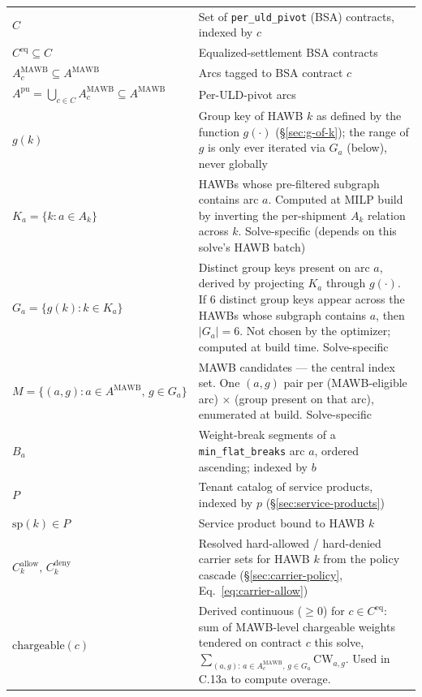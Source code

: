 \documentclass[11pt,a4paper]{article}
\theoremstyle{definition}
\begin{document}
\begin{table}[H]
\begin{tabular}{lp{11.5cm}}
$C$ & Set of \texttt{per\_uld\_pivot} (BSA) contracts, indexed by $c$ \\
$C^{\text{eq}} \subseteq C$ & Equalized-settlement BSA contracts \\
$A_c^{\text{MAWB}} \subseteq A^{\text{MAWB}}$ & Arcs tagged to BSA contract $c$ \\
$A^{\text{pu}} = \bigcup_{c \in C} A_c^{\text{MAWB}} \subseteq A^{\text{MAWB}}$ & Per-ULD-pivot arcs \\
$g(k)$ & Group key of HAWB $k$ as defined by the function $g(\cdot)$ (\S\ref{sec:g-of-k}); the range of $g$ is only ever iterated via $G_a$ (below), never globally \\
$K_a = \{k : a \in A_k\}$ & HAWBs whose pre-filtered subgraph contains arc $a$. Computed at MILP build by inverting the per-shipment $A_k$ relation across $k$. Solve-specific (depends on this solve's HAWB batch) \\
$G_a = \{g(k) : k \in K_a\}$ & Distinct group keys present on arc $a$, derived by projecting $K_a$ through $g(\cdot)$. If 6 distinct group keys appear across the HAWBs whose subgraph contains $a$, then $|G_a| = 6$. Not chosen by the optimizer; computed at build time. Solve-specific \\
$M = \{(a, g) : a \in A^{\text{MAWB}},\, g \in G_a\}$ & MAWB candidates --- the central index set. One $(a, g)$ pair per (MAWB-eligible arc) $\times$ (group present on that arc), enumerated at build. Solve-specific \\
$B_a$ & Weight-break segments of a \texttt{min\_flat\_breaks} arc $a$, ordered ascending; indexed by $b$ \\
$P$ & Tenant catalog of service products, indexed by $p$ (\S\ref{sec:service-products}) \\
$\text{sp}(k) \in P$ & Service product bound to HAWB $k$ \\
$C_k^{\text{allow}},\, C_k^{\text{deny}}$ & Resolved hard-allowed / hard-denied carrier sets for HAWB $k$ from the policy cascade (\S\ref{sec:carrier-policy}, Eq.~\ref{eq:carrier-allow}) \\
$\text{chargeable}(c)$ & Derived continuous (\(\geq 0\)) for $c \in C^{\text{eq}}$: sum of MAWB-level chargeable weights tendered on contract $c$ this solve, $\sum_{(a,g):\, a \in A_c^{\text{MAWB}},\, g \in G_a} \text{CW}_{a,g}$. Used in C.13a to compute overage. \\
\bottomrule
\end{tabular}
\end{table}
\end{document}
